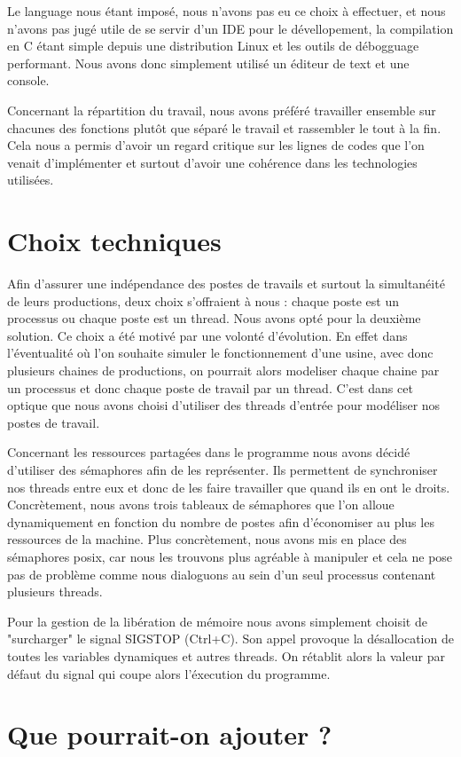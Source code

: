 \documentclass[11pt]{report}
\begin{document}
	Le language nous étant imposé, nous n'avons pas eu ce choix à effectuer, et nous n'avons pas jugé utile de se servir d'un IDE pour le dévellopement, la compilation en C étant simple depuis une distribution Linux et les outils de débogguage performant. Nous avons donc simplement utilisé un éditeur de text et une console. 
	
	Concernant la répartition du travail, nous avons préféré travailler ensemble sur chacunes des fonctions plutôt que séparé le travail et rassembler le tout à la fin. Cela nous a permis d'avoir un regard critique sur les lignes de codes que l'on venait d'implémenter et surtout d'avoir une cohérence dans les technologies utilisées. 
	\section{Choix techniques}
	Afin d'assurer une indépendance des postes de travails et surtout la simultanéité de leurs productions, deux choix s'offraient à nous : chaque poste est un processus ou chaque poste est un thread. Nous avons opté pour la deuxième solution. Ce choix a été motivé par une volonté d'évolution. En effet dans l'éventualité où l'on souhaite simuler le fonctionnement d'une usine, avec donc plusieurs chaines de productions, on pourrait alors modeliser chaque chaine par un processus et donc chaque poste de travail par un thread. C'est dans cet optique que nous avons choisi d'utiliser des threads d'entrée pour modéliser nos postes de travail.
	
	Concernant les ressources partagées dans le programme nous avons décidé d'utiliser des sémaphores afin de les représenter. Ils permettent de synchroniser nos threads entre eux et donc de les faire travailler que quand ils en ont le droits. Concrètement, nous avons trois tableaux de sémaphores que l'on alloue dynamiquement en fonction du nombre de postes afin d'économiser au plus les ressources de la machine. Plus concrètement, nous avons mis en place des sémaphores posix, car nous les trouvons plus agréable à manipuler et cela ne pose pas de problème comme nous dialoguons au sein d'un seul processus contenant plusieurs threads. 
	
	Pour la gestion de la libération de mémoire nous avons simplement choisit de "surcharger" le signal SIGSTOP (Ctrl+C). Son appel provoque la désallocation de toutes les variables dynamiques et autres threads. On rétablit alors la valeur par défaut du signal qui coupe alors l'éxecution du programme.
	
	\section{Que pourrait-on ajouter ?}
	
\end{document}
